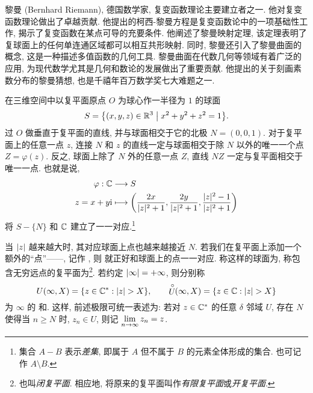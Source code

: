 \begin{people}
  黎曼 (Bernhard Riemann), 德国数学家, 复变函数理论主要建立者之一. 他对复变函数理论做出了卓越贡献. 他提出的柯西-黎曼方程是复变函数论中的一项基础性工作, 揭示了复变函数在某点可导的充要条件. 他阐述了黎曼映射定理, 该定理表明了复球面上的任何单连通区域都可以相互共形映射.
  同时, 黎曼还引入了黎曼曲面的概念, 这是一种描述多值函数的几何工具. 黎曼曲面在代数几何等领域有着广泛的应用, 为现代数学尤其是几何和数论的发展做出了重要贡献.
  他提出的关于刻画素数分布的黎曼猜想, 也是千禧年百万数学奖七大难题之一.
\end{people}

在三维空间中以复平面原点 $O$ 为球心作一半径为 $1$ 的球面
\[
  S=\bigl\{(x,y,z)\in{\mathbb{R}}^3\bigm\vert x^2+y^2+z^2=1\bigr\}.
\]
过 $O$ 做垂直于复平面的直线, 并与球面相交于它的北极 $N=(0,0,1)$.
对于复平面上的任意一点 $z$, 连接 $N$ 和 $z$ 的直线一定与球面相交于除 $N$ 以外的唯一一个点 $Z=\varphi(z)$.
反之, 球面上除了 $N$ 外的任意一点 $Z$, 直线 $NZ$ 一定与复平面相交于唯一一点.
也就是说, 
\begin{equation}
  \label{eq:polar-project}
  \begin{aligned}
    \varphi:{\mathbb{C}}&\longrightarrow S\\
    z=x+y\mathrm{i}&\longmapsto \biggl(\frac{2x}{\lvert z\rvert^2+1},\frac{2y}{\lvert z\rvert^2+1},\frac{\lvert z\rvert^2-1}{\lvert z\rvert^2+1}\biggr)
  \end{aligned}
\end{equation}
将 $S-\{N\}$ 和 ${\mathbb{C}}$ 建立了一一对应.\footnote{
  集合 $A-B$ 表示\emph{差集}, 即属于 $A$ 但不属于 $B$ 的元素全体形成的集合.
  也可记作 $A\setminus B$.
}

当 $\lvert z\rvert$ 越来越大时, 其对应球面上点也越来越接近 $N$.
若我们在复平面上添加一个额外的``点''——, 记作 \nouns{$\infty$}, 则 就正好和球面上的点一一对应.
称这样的球面为, 称包含无穷远点的复平面为\footnote{
  也叫\emph{闭复平面}. 相应地, 将原来的复平面叫作\emph{有限复平面}或\emph{开复平面}.
}.
若约定 $\lvert\infty\rvert=+\infty$, 则分别称
\[
  U(\infty,X)=\{z\in{\mathbb{C}}^*\mathrel{:} \lvert z\rvert>X\},\qquad
  \stackrel{\circ}{U}\!\!(\infty,X)=\{z\in{\mathbb{C}}\mathrel{:} \lvert z\rvert>X\}
\]
为 $\infty$ 的 和.
这样, 前述极限可统一表述为: 若对 $z\in{\mathbb{C}}^*$ 的任意 $\delta$ 邻域 $U$, 存在 $N$ 使得当 $n\ge N$ 时, $z_n\in U$, 则记 $\lim\limits_{n\rightarrow\infty}z_n=z$.

